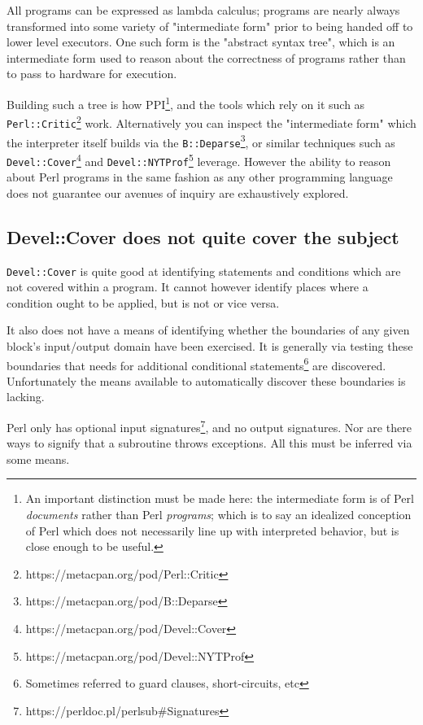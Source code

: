 \documentclass{article}
\begin{document}
All programs can be expressed as lambda calculus; programs are nearly always transformed into some variety of "intermediate form" prior to being handed off to lower level executors.
One such form is the "abstract syntax tree", which is an intermediate form used to reason about the correctness of programs rather than to pass to hardware for execution.

Building such a tree is how PPI\footnote{An important distinction must be made here: the intermediate form is of Perl \textit{documents} rather than Perl \textit{programs}; which is to say an idealized conception of Perl which does not necessarily line up with interpreted behavior, but is close enough to be useful.},
and the tools which rely on it such as \texttt{Perl::Critic}\footnote{https://metacpan.org/pod/Perl::Critic} work.
Alternatively you can inspect the "intermediate form" which the interpreter itself builds via the \texttt{B::Deparse}\footnote{https://metacpan.org/pod/B::Deparse},
or similar techniques such as \texttt{Devel::Cover}\footnote{https://metacpan.org/pod/Devel::Cover} and \texttt{Devel::NYTProf}\footnote{https://metacpan.org/pod/Devel::NYTProf} leverage.
However the ability to reason about Perl programs in the same fashion as any other programming language does not guarantee our avenues of inquiry are exhaustively explored.

\subsection{Devel::Cover does not quite cover the subject}

\texttt{Devel::Cover} is quite good at identifying statements and conditions which are not covered within a program.
It cannot however identify places where a condition ought to be applied, but is not or vice versa.

It also does not have a means of identifying whether the boundaries of any given block's input/output domain have been exercised.
It is generally via testing these boundaries that needs for additional conditional statements\footnote{Sometimes referred to guard clauses, short-circuits, etc} are discovered.
Unfortunately the means available to automatically discover these boundaries is lacking.

Perl only has optional input signatures\footnote{https://perldoc.pl/perlsub\#Signatures}, and no output signatures.
Nor are there ways to signify that a subroutine throws exceptions.
All this must be inferred via some means.
\end{document}
